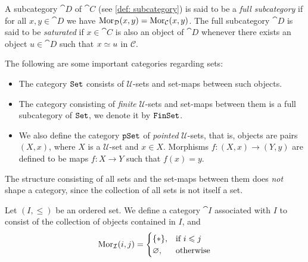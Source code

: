 \begin{definition}\label{def: full subcategory}
A subcategory \(\cat D\) of \(\cat C\) (see \cref{def: subcategory}) is said to
be a \emph{full subcategory} if for all \(x, y \in \cat D\) we have
\(\operatorname{Mor}_{\mathcal D}(x, y) = \operatorname{Mor}_{\mathcal C}(x, y)\). The full subcategory \(\cat D\)
is said to be \emph{saturated} if \(x \in \cat C\) is also an object of \(\cat D\)
whenever there exists an object \(u \in \cat D\) such that \(x \simeq u\) in
\(\mathcal C\).
\end{definition}

\begin{example}
\label{exp:set-based-categories}
The following are some important categories regarding sets:
\begin{itemize}\setlength\itemsep{0em}
\item The category \({\texttt{Set}}\) consists of \(\mathcal U\)-sets and set-maps between
  such objects.
\item The category consisting of \emph{finite} \(\mathcal U\)-sets and set-maps
  between them is a full subcategory of \({\texttt{Set}}\), we denote it by \({\texttt{FinSet}}\).
\item We also define the category \({\texttt{pSet}}\) of \emph{pointed} \(\mathcal
  U\)-sets, that is, objects are pairs \((X, x)\), where \(X\) is a \(\mathcal
  U\)-set and \(x \in X\). Morphisms \(f: (X, x) \to (Y, y)\) are defined to be
  maps \(f: X \to Y\) such that \(f(x) = y\).
\end{itemize}
\end{example}

\begin{remark}
The structure consisting of all sets and the set-maps between them does
\emph{not} shape a category, since the collection of all sets is not itself a
set.
\end{remark}

\begin{example}
\label{exp:order-category}
Let \((I, \leq)\) be an ordered set. We define a category \(\cat I\)
associated with \(I\) to consist of the collection of objects contained in
\(I\), and
\[
  \operatorname{Mor}_{\mathcal I}(i, j) =
  \begin{cases}
    \{*\}, &\text{if } i \leqslant j \\
    \varnothing, &\text{otherwise}
  \end{cases}
\]
\end{example}


